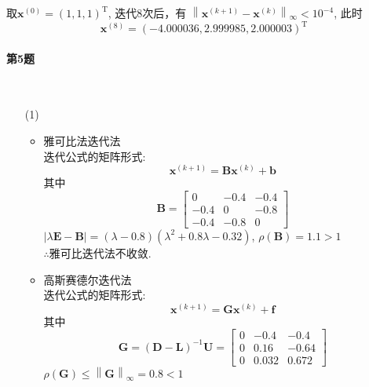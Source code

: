 \documentclass[a4paper]{article}
\begin{document}
\begin{enumerate}
\begin{itemize}
\begin{equation}
        \end{equation}
        取$\boldsymbol{x}^{(0)} = (1, 1, 1)^{\mathrm{T}}$, 迭代8次后，有
        $\left\|\boldsymbol{x}^{(k+1)}-\boldsymbol{x}^{(k)}\right\|_{\infty}<10^{-4}$, 此时 $$\boldsymbol{x}^{(8)}=(-4.000036,2.999985,2.000003)^{\mathrm{T}}$$
    \end{itemize}
\end{enumerate}


\newpage
\paragraph{第5题}~{}
\\

\begin{enumerate}
    \item [(1)]
    \begin{itemize}
        \item 雅可比法迭代法 \\
        迭代公式的矩阵形式:$$\boldsymbol{x}^{(k+1)} = \boldsymbol{B}\boldsymbol{x}^{(k)} + \boldsymbol{b}$$
        其中
        \begin{equation}
            \boldsymbol{B} =\left[\begin{array}{rrr}0 & -0.4 & -0.4 \\ -0.4 & 0 & -0.8 \\ -0.4 & -0.8 & 0\end{array}\right] \nonumber
        \end{equation}
        $\left|\lambda \boldsymbol{E}-\mathbf{B}\right|=(\lambda-0.8)\left(\lambda^{2}+0.8 \lambda-0.32\right)$, $\rho\left(\boldsymbol{B}\right)=1.1>1$ \\
        $\therefore$雅可比迭代法不收敛.
        \item 高斯赛德尔迭代法 \\
        迭代公式的矩阵形式:$$\boldsymbol{x}^{(k+1)} = \boldsymbol{G}\boldsymbol{x}^{(k)} + \boldsymbol{f}$$
        其中
        \begin{equation}
            \boldsymbol{G}=(\boldsymbol{D}-\mathbf{L})^{-1} \mathbf{U}=\left[\begin{array}{rrr}0 & -0.4 & -0.4 \\ 0 & 0.16 & -0.64 \\ 0 & 0.032 & 0.672\end{array}\right] \nonumber
        \end{equation}
        $\rho\left(\boldsymbol{G}\right) \leqslant\left\|\boldsymbol{G}\right\|_{\infty}=0.8<1$ \\

\end{itemize}
\end{enumerate}
\end{document}
